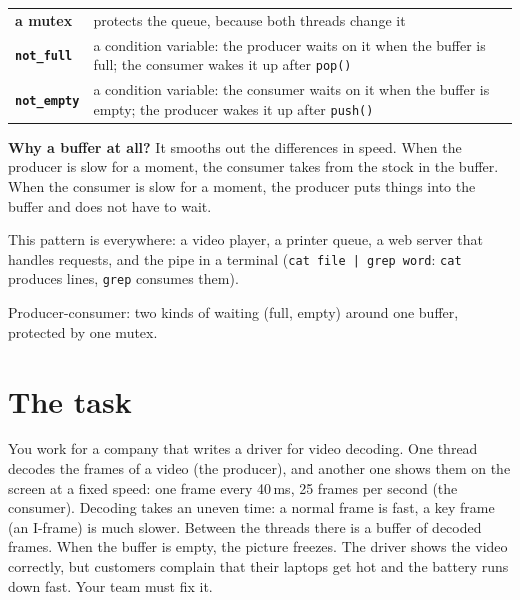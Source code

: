 \begin{center}
\renewcommand{\arraystretch}{1.2}
\begin{tabularx}{\linewidth}{@{}lX@{}}
\toprule
\textbf{a mutex} & protects the queue, because both threads change it \\
\textbf{\texttt{not\_full}} & a condition variable: the producer waits on it when the buffer is full; the consumer
  wakes it up after \texttt{pop()} \\
\textbf{\texttt{not\_empty}} & a condition variable: the consumer waits on it when the buffer is empty; the producer
  wakes it up after \texttt{push()} \\
\bottomrule
\end{tabularx}
\end{center}

\textbf{Why a buffer at all?} It smooths out the differences in speed. When the producer is slow for a moment,
the consumer takes from the stock in the buffer. When the consumer is slow for a moment, the producer puts things
into the buffer and does not have to wait.

This pattern is everywhere: a video player, a printer queue, a web server that handles requests, and the pipe in
a terminal (\texttt{cat file | grep word}: \texttt{cat} produces lines, \texttt{grep} consumes them).

\begin{keymsg}
Producer-consumer: two kinds of waiting (full, empty) around one buffer, protected by one mutex.
\end{keymsg}

\section{The task}

\begin{story}
You work for a company that writes a driver for video decoding. One thread decodes the frames of a video (the
producer), and another one shows them on the screen at a fixed speed: one frame every 40\,ms, 25 frames per
second (the consumer). Decoding takes an uneven time: a normal frame is fast, a key frame (an I-frame) is much
slower. Between the threads there is a buffer of decoded frames. When the buffer is empty, the picture freezes.
The driver shows the video correctly, but customers complain that their laptops get hot and the battery runs down fast.
Your team must fix it.
\end{story}

